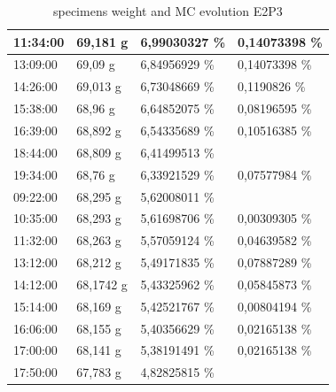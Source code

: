 \begin{table}[]
\begin{tabular}{llll}
		\multicolumn{1}{|l|}{11:34:00} & \multicolumn{1}{l|}{69,181 g} & \multicolumn{1}{l|}{6,99030327   \%} & \multicolumn{1}{l|}{0,14073398 \%} \\ \hline
		\multicolumn{1}{|l|}{13:09:00} & \multicolumn{1}{l|}{69,09 g} & \multicolumn{1}{l|}{6,84956929   \%} & \multicolumn{1}{l|}{0,14073398 \%} \\ \hline
		\multicolumn{1}{|l|}{14:26:00} & \multicolumn{1}{l|}{69,013 g} & \multicolumn{1}{l|}{6,73048669   \%} & \multicolumn{1}{l|}{0,1190826 \%} \\ \hline
		\multicolumn{1}{|l|}{15:38:00} & \multicolumn{1}{l|}{68,96 g} & \multicolumn{1}{l|}{6,64852075   \%} & \multicolumn{1}{l|}{0,08196595 \%} \\ \hline
		\multicolumn{1}{|l|}{16:39:00} & \multicolumn{1}{l|}{68,892 g} & \multicolumn{1}{l|}{6,54335689   \%} & \multicolumn{1}{l|}{0,10516385 \%} \\ \hline
		\multicolumn{1}{|l|}{18:44:00} & \multicolumn{1}{l|}{68,809 g} & \multicolumn{1}{l|}{6,41499513   \%} &  \\ \hline
		\multicolumn{1}{|l|}{19:34:00} & \multicolumn{1}{l|}{68,76 g} & \multicolumn{1}{l|}{6,33921529   \%} & \multicolumn{1}{l|}{0,07577984 \%} \\ \hline
		\multicolumn{1}{|l|}{\cellcolor[HTML]{A5A5A5}09:22:00} & \multicolumn{1}{l|}{68,295 g} & \multicolumn{1}{l|}{5,62008011   \%} &  \\ \hline
		\multicolumn{1}{|l|}{10:35:00} & \multicolumn{1}{l|}{68,293 g} & \multicolumn{1}{l|}{5,61698706   \%} & \multicolumn{1}{l|}{0,00309305 \%} \\ \hline
		\multicolumn{1}{|l|}{11:32:00} & \multicolumn{1}{l|}{68,263 g} & \multicolumn{1}{l|}{\cellcolor[HTML]{FFC000}5,57059124   \%} & \multicolumn{1}{l|}{0,04639582   \%} \\ \hline
		\multicolumn{1}{|l|}{13:12:00} & \multicolumn{1}{l|}{68,212 g} & \multicolumn{1}{l|}{\cellcolor[HTML]{FFC000}5,49171835   \%} & \multicolumn{1}{l|}{0,07887289   \%} \\ \hline
		\multicolumn{1}{|l|}{14:12:00} & \multicolumn{1}{l|}{68,1742 g} & \multicolumn{1}{l|}{\cellcolor[HTML]{FFC000}5,43325962   \%} & \multicolumn{1}{l|}{0,05845873   \%} \\ \hline
		\multicolumn{1}{|l|}{15:14:00} & \multicolumn{1}{l|}{68,169 g} & \multicolumn{1}{l|}{\cellcolor[HTML]{FFC000}5,42521767   \%} & \multicolumn{1}{l|}{0,00804194   \%} \\ \hline
		\multicolumn{1}{|l|}{16:06:00} & \multicolumn{1}{l|}{68,155 g} & \multicolumn{1}{l|}{\cellcolor[HTML]{FFC000}5,40356629   \%} & \multicolumn{1}{l|}{0,02165138   \%} \\ \hline
		\multicolumn{1}{|l|}{17:00:00} & \multicolumn{1}{l|}{68,141 g} & \multicolumn{1}{l|}{\cellcolor[HTML]{FFC000}5,38191491   \%} & \multicolumn{1}{l|}{0,02165138   \%} \\ \hline
		\multicolumn{1}{|l|}{17:50:00} & \multicolumn{1}{l|}{67,783 g} & \multicolumn{1}{l|}{\cellcolor[HTML]{FFC000}4,82825815   \%} &  \\ \cline{1-3}
	\end{tabular}
	\caption{specimens weight and MC evolution E2P3}
	\label{tab:Tab9}
\end{table}
